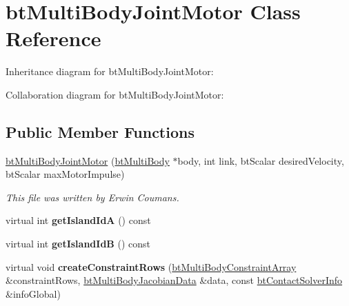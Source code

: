 \hypertarget{classbt_multi_body_joint_motor}{\section{bt\+Multi\+Body\+Joint\+Motor Class Reference}
\label{classbt_multi_body_joint_motor}
}


Inheritance diagram for bt\+Multi\+Body\+Joint\+Motor\+:


Collaboration diagram for bt\+Multi\+Body\+Joint\+Motor\+:
\subsection*{Public Member Functions}
\begin{DoxyCompactItemize}
\item 
\hypertarget{classbt_multi_body_joint_motor_a6bc2a411ab80cbe9bdc2b59c1f582874}{\hyperlink{classbt_multi_body_joint_motor_a6bc2a411ab80cbe9bdc2b59c1f582874}{bt\+Multi\+Body\+Joint\+Motor} (\hyperlink{classbt_multi_body}{bt\+Multi\+Body} $\ast$body, int link, bt\+Scalar desired\+Velocity, bt\+Scalar max\+Motor\+Impulse)}\label{classbt_multi_body_joint_motor_a6bc2a411ab80cbe9bdc2b59c1f582874}

\begin{DoxyCompactList}\small\item\em This file was written by Erwin Coumans. \end{DoxyCompactList}\item 
\hypertarget{classbt_multi_body_joint_motor_a6ecdddc28fc32dd4ec37bcd038442abd}{virtual int {\bfseries get\+Island\+Id\+A} () const }\label{classbt_multi_body_joint_motor_a6ecdddc28fc32dd4ec37bcd038442abd}

\item 
\hypertarget{classbt_multi_body_joint_motor_aaec7398520e242d624869277c17622fd}{virtual int {\bfseries get\+Island\+Id\+B} () const }\label{classbt_multi_body_joint_motor_aaec7398520e242d624869277c17622fd}

\item 
\hypertarget{classbt_multi_body_joint_motor_ab8c953712a4b79792e7eb1e5a59d6d46}{virtual void {\bfseries create\+Constraint\+Rows} (\hyperlink{classbt_aligned_object_array}{bt\+Multi\+Body\+Constraint\+Array} \&constraint\+Rows, \hyperlink{structbt_multi_body_jacobian_data}{bt\+Multi\+Body\+Jacobian\+Data} \&data, const \hyperlink{structbt_contact_solver_info}{bt\+Contact\+Solver\+Info} \&info\+Global)}\label{classbt_multi_body_joint_motor_ab8c953712a4b79792e7eb1e5a59d6d46}

\end{DoxyCompactItemize}
